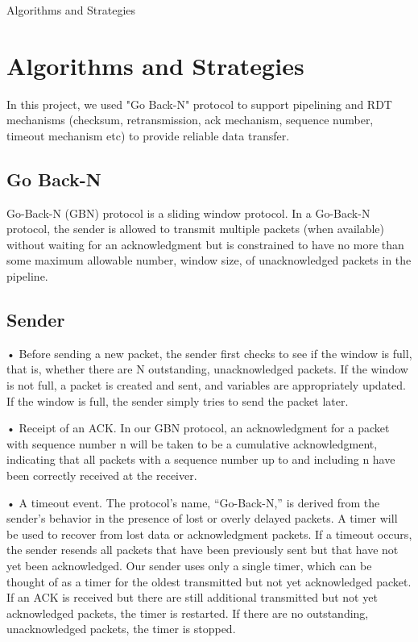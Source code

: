 \documentclass[conference]{IEEEtran}
\begin{document}
Algorithms and Strategies

\section{Algorithms and Strategies}
In this project, we used "Go Back-N" protocol to support pipelining and RDT mechanisms (checksum, retransmission, ack mechanism, sequence number, timeout mechanism etc)  to provide reliable data transfer.
\subsection{Go Back-N}

Go-Back-N (GBN) protocol is a sliding window protocol. In a Go-Back-N protocol, the sender is allowed to transmit multiple packets (when available) without waiting for an acknowledgment but is constrained to have no more than some maximum allowable number, window size, of unacknowledged packets in the pipeline.

\subsection*{Sender}
• Before sending a new packet, the sender first checks to see if the window is full, that is, whether there are N outstanding, unacknowledged packets. If the window is not full, a packet is created and sent, and variables are appropriately updated. If the window is full, the sender simply tries to send the packet later. 

• Receipt of an ACK. In our GBN protocol, an acknowledgment for a packet with sequence number n will be taken to be a cumulative acknowledgment, indicating that all packets with a sequence number up to and including n have been correctly received at the receiver.

• A timeout event. The protocol’s name, “Go-Back-N,” is derived from the sender’s behavior in the presence of lost or overly delayed packets. A timer will be used to recover from lost data or acknowledgment packets. If a timeout occurs, the sender resends all packets that have been previously sent but that have not yet been acknowledged. Our sender uses only a single timer, which can be thought of as a timer for the oldest transmitted but not yet acknowledged packet. If an ACK is received but there are still additional transmitted but not yet acknowledged packets, the timer is restarted. If there are no outstanding, unacknowledged packets, the timer is stopped.
\end{document}
